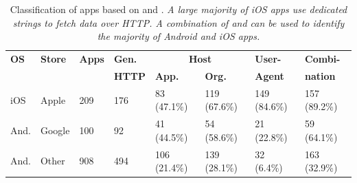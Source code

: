 

\begin{table} 
     \centering
     \begin{small}
     \begin{tabular}{|p{}|p{}|p{}|p{}|p{}|p{}|p{}|p{}|}
        \hline
        {\bf OS}&{\bf Store}&{\bf Apps}&{\bf Gen.}&\multicolumn{2}{|c|}{\bf Host} & {\bf User-}&{\bf Combi-} \tabularnewline
        \cline{5-6}    
             &        &     & {\bf HTTP} & {\bf App. } & {\bf Org.}& \bf{Agent}   & \bf{nation}  \tabularnewline                
        \hline    
        iOS  & Apple  & 209 & 176 & 83 (47.1\%)  &  119 (67.6\%)   &  149 (84.6\%)& 157 (89.2\%) \tabularnewline
        \hline
        And. & Google & 100 & 92  & 41 (44.5\%)  &  54 (58.6\%)    &  21 (22.8\%) &  59 (64.1\%)  \tabularnewline
        \hline    
        And. & Other  & 908 & 494 & 106 (21.4\%) & 139 (28.1\%)     &  32 (6.4\%)  &  163 (32.9\%)  \tabularnewline
        \hline
     \end{tabular}
     \end{small}
     \caption{Classification of apps based on \httphost and \useragent. \emph{A large majority of iOS apps use dedicated \useragent strings to fetch data over HTTP. A combination of \useragent and \httphost can be used to identify the majority of Android and iOS apps.} }
     \label{tab:classification-success}
\end{table}


